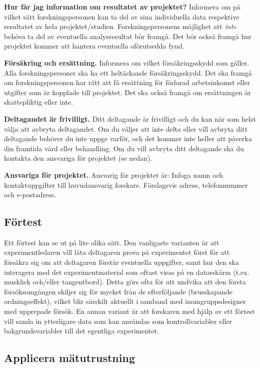 \documentclass[
]{book}
\begin{document}
\textbf{Hur får jag information om resultatet av projektet?} Informera om på vilket sätt forskningspersonen kan ta del av sina individuella data respektive resultatet av hela projektet/studien. Forskningspersonens möjlighet att \emph{inte} behöva ta del av eventuella analysresultat bör framgå. Det bör också framgå hur projektet kommer att hantera eventuella oförutsedda fynd.

\textbf{Försäkring och ersättning.} Informera om vilket försäkringsskydd som gäller. Alla forskningspersoner ska ha ett heltäckande försäkringsskydd. Det ska framgå om forskningspersonen har rätt att få ersättning för förlorad arbetsinkomst eller utgifter som är kopplade till projektet. Det ska också framgå om ersättningen är skattepliktig eller inte.

\textbf{Deltagandet är frivilligt.} Ditt deltagande är frivilligt och du kan när som helst välja att avbryta deltagandet. Om du väljer att inte delta eller vill avbryta ditt deltagande behöver du inte uppge varför, och det kommer inte heller att påverka din framtida vård eller behandling. Om du vill avbryta ditt deltagande ska du kontakta den ansvariga för projektet (se nedan).

\textbf{Ansvariga för projektet.} Ansvarig för projektet är: Infoga namn och kontaktuppgifter till huvudansvarig forskare. Förslagsvis adress, telefonnummer och e-postadress.

\hypertarget{sub07.6.3}{%
\subsection{Förtest}\label{sub07.6.3}}

Ett förtest kan se ut på lite olika sätt. Den vanligaste varianten är att experimentledaren vill låta deltagaren prova på experimentet först för att försäkra sig om att deltagaren förstår eventuella uppgifter, samt hur den ska interagera med det experimentmaterial som oftast visas på en datorskärm (t.ex. musklick och/eller tangentbord). Detta görs ofta för att undvika att den första försöksomgången skiljer sig för mycket från de efterföljande (brusskapande ordningseffekt), vilket blir särskilt aktuellt i samband med inomgruppsdesigner med upprepade försök. En annan variant är att forskaren med hjälp av ett förtest vill samla in ytterligare data som kan användas som kontrollvariabler eller bakgrundsvariabler till det egentliga experimentet.

\hypertarget{sub07.6.4}{%
\subsection{Applicera mätutrustning}\label{sub07.6.4}}
\end{document}
